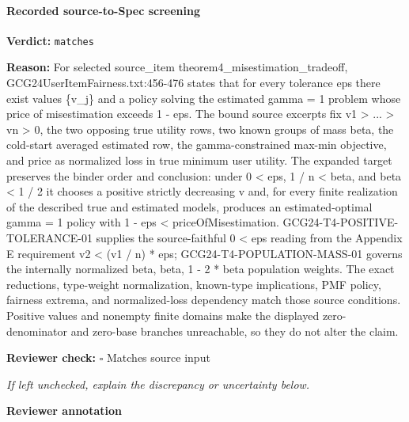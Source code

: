 \documentclass[10pt]{article}
\newcommand{\reviewerbox}{%
  \par\noindent\fbox{\parbox{0.96\linewidth}{\rule{0pt}{0.38in}}}\par
}
\newcommand{\reviewmatch}[1]{%
  \par\noindent\textbf{Reviewer check:} $\square$\; #1\par
  \noindent\emph{If left unchecked, explain the discrepancy or uncertainty below.}\par
}
\begin{document}
\paragraph{Recorded source-to-Spec screening}
\textbf{Verdict:} \texttt{matches}
\\
{\raggedright
\textbf{Reason:} For selected source\_\allowbreak{}item theorem4\_\allowbreak{}misestimation\_\allowbreak{}tradeoff, GCG24UserItemFairness.\allowbreak{}txt:\allowbreak{}456-\allowbreak{}476 states that for every tolerance eps there exist values \{v\_\allowbreak{}j\} and a policy solving the estimated gamma = 1 problem whose price of misestimation exceeds 1 -\allowbreak{} eps.\allowbreak{} The bound source excerpts fix v1 > .\allowbreak{}.\allowbreak{}.\allowbreak{} > vn > 0, the two opposing true utility rows, two known groups of mass beta, the cold-\allowbreak{}start averaged estimated row, the gamma-\allowbreak{}constrained max-\allowbreak{}min objective, and price as normalized loss in true minimum user utility.\allowbreak{} The expanded target preserves the binder order and conclusion:\allowbreak{} under 0 < eps, 1 /\allowbreak{} n < beta, and beta < 1 /\allowbreak{} 2 it chooses a positive strictly decreasing v and, for every finite realization of the described true and estimated models, produces an estimated-\allowbreak{}optimal gamma = 1 policy with 1 -\allowbreak{} eps < priceOfMisestimation.\allowbreak{} GCG24-\allowbreak{}T4-\allowbreak{}POSITIVE-\allowbreak{}TOLERANCE-\allowbreak{}01 supplies the source-\allowbreak{}faithful 0 < eps reading from the Appendix E requirement v2 < (v1 /\allowbreak{} n) * eps;\allowbreak{} GCG24-\allowbreak{}T4-\allowbreak{}POPULATION-\allowbreak{}MASS-\allowbreak{}01 governs the internally normalized beta, beta, 1 -\allowbreak{} 2 * beta population weights.\allowbreak{} The exact reductions, type-\allowbreak{}weight normalization, known-\allowbreak{}type implications, PMF policy, fairness extrema, and normalized-\allowbreak{}loss dependency match those source conditions.\allowbreak{} Positive values and nonempty finite domains make the displayed zero-\allowbreak{}denominator and zero-\allowbreak{}base branches unreachable, so they do not alter the claim.\allowbreak{}
\par}
\reviewmatch{Matches source input}
\noindent\textbf{Reviewer annotation}\par
\reviewerbox
\end{document}
